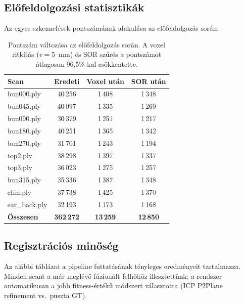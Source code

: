 \documentclass[12pt,a4paper]{article}
\begin{document}
\subsection{Előfeldolgozási statisztikák}

Az egyes szkennelések pontszámának alakulása az előfeldolgozás során:

\begin{table}[H]
\centering
\begin{tabular}{lccc}
\toprule
\textbf{Scan} & \textbf{Eredeti} & \textbf{Voxel után} & \textbf{SOR után} \\
\midrule
bun000.ply     & 40\,256 & 1\,408 & 1\,348 \\
bun045.ply     & 40\,097 & 1\,335 & 1\,269 \\
bun090.ply     & 30\,379 & 1\,251 & 1\,217 \\
bun180.ply     & 40\,251 & 1\,365 & 1\,342 \\
bun270.ply     & 31\,701 & 1\,243 & 1\,194 \\
top2.ply       & 38\,298 & 1\,397 & 1\,337 \\
top3.ply       & 36\,023 & 1\,275 & 1\,257 \\
bun315.ply     & 35\,336 & 1\,387 & 1\,348 \\
chin.ply       & 37\,738 & 1\,425 & 1\,370 \\
ear\_back.ply  & 32\,193 & 1\,173 & 1\,168 \\
\midrule
\textbf{Összesen} & \textbf{362\,272} & \textbf{13\,259} & \textbf{12\,850} \\
\bottomrule
\end{tabular}
\caption{Pontszám változása az előfeldolgozás során. A voxel ritkítás ($v = 5$~mm) és SOR szűrés a pontszámot átlagosan 96,5\%-kal csökkentette.}
\end{table}

\subsection{Regisztrációs minőség}

Az alábbi táblázat a pipeline futtatásának tényleges eredményeit tartalmazza. Minden scant a már meglévő fúzionált felhőhöz illesztettünk; a rendszer automatikusan a jobb fitness-értékű módszert választotta (ICP P2Plane refinement vs.\ puszta GT).
\end{document}

